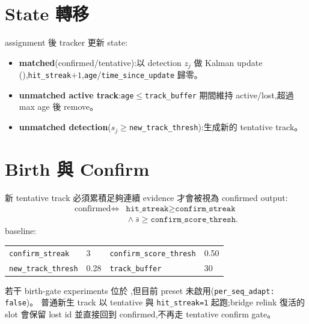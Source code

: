 \section{State 轉移}\label{sec:lc-states}
assignment 後 tracker 更新 state:
\begin{itemize}\setlength\itemsep{2pt}
  \item \textbf{matched}(confirmed/tentative):以 detection \(z_j\) 做 Kalman update
        (),\texttt{hit\_streak}\(+1\),\texttt{age}/\texttt{time\_since\_update}
        歸零。
  \item \textbf{unmatched active track}:\texttt{age}\(\le\)\texttt{track\_buffer} 期間維持
        active/lost,超過 max age 後 remove。
  \item \textbf{unmatched detection}(\(s_j\ge\)\texttt{new\_track\_thresh}):生成新的
        tentative track。
\end{itemize}

\section{Birth 與 Confirm}\label{sec:lc-confirm}
新 tentative track 必須累積足夠連續 evidence 才會被視為 confirmed output:
\begin{equation}\label{eq:lc-confirm}
\begin{aligned}
  \text{confirmed}\iff{}&
  \texttt{hit\_streak}\ge\texttt{confirm\_streak}\\
  &{}\land\bar{s}\ge\texttt{confirm\_score\_thresh}.
\end{aligned}
\end{equation}
baseline:
\begin{center}\small
\begin{tabular}{@{}ll@{\qquad}ll@{}}
\texttt{confirm\_streak} & 3 &
\texttt{confirm\_score\_thresh} & 0.50 \\
\texttt{new\_track\_thresh} & 0.28 &
\texttt{track\_buffer} & 30
\end{tabular}
\end{center}
若干 birth-gate experiments 位於 ,但目前
preset 未啟用(\texttt{per\_seq\_adapt: false})。
普通新生 track 以 tentative 與 \texttt{hit\_streak=1} 起跑;bridge relink 復活的
slot 會保留 lost id 並直接回到 confirmed,不再走 tentative confirm gate。

